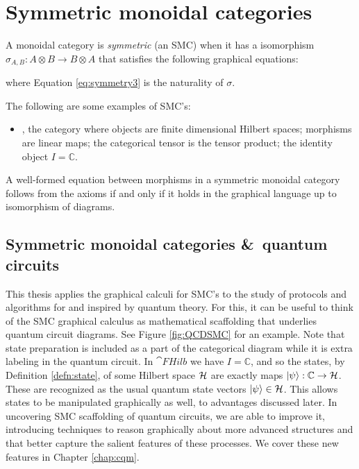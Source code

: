 \section{Symmetric monoidal categories}

\begin{defn}
A monoidal category is \emph{symmetric} (an SMC) when it has a isomorphism
$\sigma_{A,B}:A\otimes B\to B\otimes A$ that satisfies the following graphical equations:
\begin{equation}
\label{eq:symmetry}

\end{equation}
\begin{equation}
\label{eq:symmetry2}

\end{equation}
\begin{equation}
\label{eq:symmetry3}

\end{equation}
\end{defn}
\noindent where Equation \ref{eq:symmetry3} is the naturality of $\sigma$.

\begin{examples}
The following are some examples of SMC's:
\begin{itemize}
\item {}, the category where objects are finite dimensional Hilbert spaces; morphisms are linear maps; the categorical tensor is the tensor product; the identity object $I=\mathbb{C}$.
\end{itemize}
\end{examples}

\begin{theorem}{\cite[Thm 2.3]{joyal1991geometry}}
A well-formed equation between morphisms in a symmetric monoidal category follows from the axioms if and only if it holds in the graphical language up to isomorphism of diagrams.
\end{theorem}

\subsection{Symmetric monoidal categories \&\ quantum circuits}
This thesis applies the graphical calculi for SMC's to the study of protocols and algorithms for and inspired by quantum theory. For this, it can be useful to think of the SMC graphical calculus as mathematical scaffolding that underlies quantum circuit diagrams. See Figure \ref{fig:QCDSMC} for an example. Note that state preparation is included as a part of the categorical diagram while it is extra labeling in the quantum circuit. In $\cat{FHilb}$ we have $I=\mathbb{C}$, and so the states, by Definition \ref{defn:state}, of some Hilbert space $\mathcal{H}$ are exactly maps $| \psi \rangle:\mathbb{C}\to\mathcal{H}$. These are recognized as the usual quantum state vectors $| \psi \rangle\in\mathcal{H}$. This allows states to be manipulated graphically as well, to advantages discussed later. In uncovering SMC scaffolding of quantum circuits, we are able to improve it, introducing techniques to reason graphically about more advanced structures and that better capture the salient features of these processes. We cover these new features in Chapter \ref{chap:cqm}.

